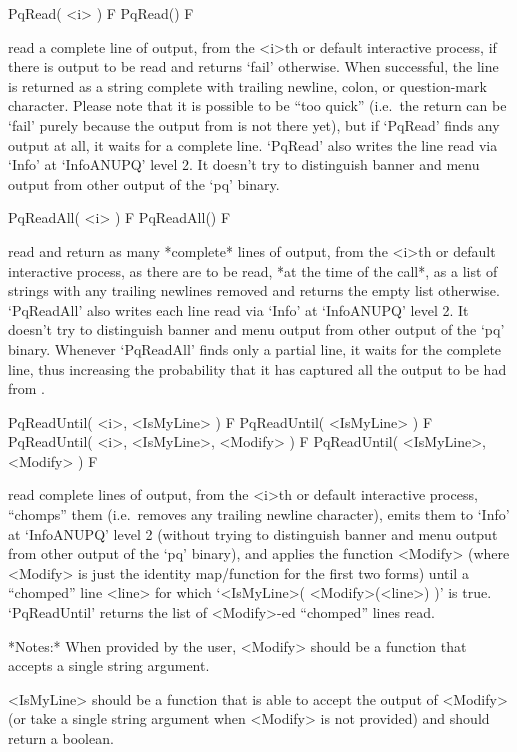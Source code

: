\>PqRead( <i> ) F
\>PqRead() F

read a complete line of  {\ANUPQ}  output,  from  the  <i>th  or  default
interactive {\ANUPQ} process, if there is output to be read  and  returns
`fail' otherwise. When successful, the  line  is  returned  as  a  string
complete with trailing newline, colon, or question-mark character. Please
note that it is possible to be ``too  quick''  (i.e.~the  return  can  be
`fail' purely because the output from {\ANUPQ} is not there yet), but  if
`PqRead' finds any output at all, it waits for a complete line.  `PqRead'
also writes the line read via `Info' at `InfoANUPQ' level 2.  It  doesn't
try to distinguish banner and menu output from other output of  the  `pq'
binary.

\>PqReadAll( <i> ) F
\>PqReadAll() F

read and return as many *complete* lines of  {\ANUPQ}  output,  from  the
<i>th or default interactive {\ANUPQ} process, as there are to  be  read,
*at the time of the call*,  as  a  list  of  strings  with  any  trailing
newlines removed and returns the empty list otherwise.  `PqReadAll'  also
writes each line read via `Info' at `InfoANUPQ' level 2. It  doesn't  try
to distinguish banner and menu output  from  other  output  of  the  `pq'
binary. Whenever `PqReadAll' finds only a partial line, it waits for  the
complete line, thus increasing the probability that it has  captured  all
the output to be had from {\ANUPQ}.

\>PqReadUntil( <i>, <IsMyLine> ) F
\>PqReadUntil( <IsMyLine> ) F
\>PqReadUntil( <i>, <IsMyLine>, <Modify> ) F
\>PqReadUntil( <IsMyLine>, <Modify> ) F

read complete lines  of  {\ANUPQ}  output,  from  the  <i>th  or  default
interactive {\ANUPQ} process, ``chomps'' them (i.e.~removes any  trailing
newline character), emits them to `Info' at `InfoANUPQ' level 2  (without
trying to distinguish banner and menu output from  other  output  of  the
`pq' binary), and applies the function <Modify> (where <Modify>  is  just
the identity map/function for the first two forms)  until  a  ``chomped''
line  <line>  for  which  `<IsMyLine>(  <Modify>(<line>)  )'   is   true.
`PqReadUntil' returns the list of <Modify>-ed ``chomped'' lines read.

*Notes:* 
When provided by the user, <Modify> should be a function that  accepts  a
single string argument.

<IsMyLine> should be a function that is able  to  accept  the  output  of
<Modify> (or take a single string argument when <Modify> is not provided)
and should return a boolean.

